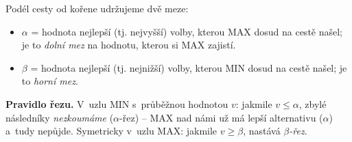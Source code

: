 \begin{definice}
Podél cesty od kořene udržujeme dvě meze:
\begin{itemize}
  \item $\alpha$ = hodnota nejlepší (tj. nejvyšší) volby, kterou MAX dosud na cestě našel; je to \emph{dolní mez} na hodnotu, kterou si MAX zajistí.
  \item $\beta$ = hodnota nejlepší (tj. nejnižší) volby, kterou MIN dosud na cestě našel; je to \emph{horní mez}.
\end{itemize}
\textbf{Pravidlo řezu.} V~uzlu MIN s~průběžnou hodnotou $v$: jakmile $v \le \alpha$, zbylé následníky \emph{nezkoumáme} ($\alpha$-řez) -- MAX nad námi už má lepší alternativu ($\alpha$) a~tudy nepůjde. Symetricky v~uzlu MAX: jakmile $v \ge \beta$, nastává \emph{$\beta$-řez}.
\end{definice}

